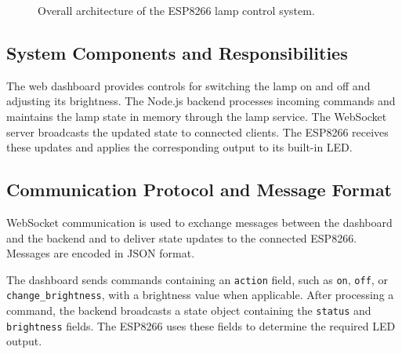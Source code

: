 \documentclass[12pt,a4paper]{article}
\begin{document}
\begin{figure}[htbp]
{%
    }
    \caption{Overall architecture of the ESP8266 lamp control system.}
    \label{fig:system-architecture}
\end{figure}

\vspace{0.5cm}

\subsection*{System Components and Responsibilities}

The web dashboard provides controls for switching the lamp on
and off and adjusting its brightness. The Node.js backend
processes incoming commands and maintains the lamp state in
memory through the lamp service. The WebSocket server
broadcasts the updated state to connected clients. The ESP8266
receives these updates and applies the corresponding output
to its built-in LED.

\vspace{0.8cm}

\subsection*{Communication Protocol and Message Format}

WebSocket communication is used to exchange messages between
the dashboard and the backend and to deliver state updates to
the connected ESP8266. Messages are encoded in JSON format.

The dashboard sends commands containing an \texttt{action}
field, such as \texttt{on}, \texttt{off}, or
\texttt{change\_brightness}, with a brightness value when
applicable. After processing a command, the backend broadcasts
a state object containing the \texttt{status} and
\texttt{brightness} fields. The ESP8266 uses these fields to
determine the required LED output.
\end{document}
